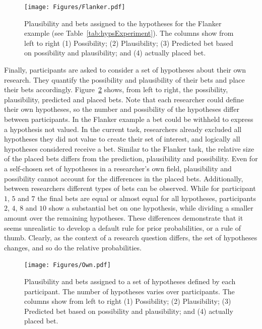 \documentclass[man]{apa6}
\begin{document}
\begin{figure}
	\texttt{[image: Figures/Flanker.pdf]}
	\caption{Plausibility and bets assigned to the hypotheses for the Flanker example (see Table~\ref{tab:hypsExperiment}). The columns show from left to right (1) Possibility; (2) Plausibility; (3) Predicted bet based on possibility and plausibility; and (4) actually placed bet.}
	\label{fig:flanker}
\end{figure}

Finally, participants are asked to consider a set of hypotheses about their own research.
They quantify the possibility and plausibility of their bets and place their bets accordingly.
Figure~\ref{fig:ownhyp} shows, from left to right, the possibility, plausibility, predicted and placed bets.
Note that each researcher could define their own hypotheses, so the number and possibility of the hypotheses differ between participants.
In the Flanker example a bet could be withheld to express a hypothesis not valued.
In the current task, researchers already excluded all hypotheses they did not value to create their set of interest, and logically all hypotheses considered receive a bet.
Similar to the Flanker task, the relative size of the placed bets differs from the prediction, plausibility and possibility.
Even for a self-chosen set of hypotheses in a researcher's own field, plausibility and possibility cannot account for the differences in the placed bets.
Additionally, between researchers different types of bets can be observed. 
While for participant $1$, $5$ and $7$ the final bets are equal or almost equal for all hypotheses, participants $2$, $4$, $8$ and $10$ show a substantial bet on one hypothesis, while dividing a smaller amount over the remaining hypotheses.
These differences demonstrate that it seems unrealistic to develop a default rule for prior probabilities, or a rule of thumb. 
Clearly, as the context of a research question differs, the set of hypotheses changes, and so do the relative probabilities.

\begin{figure}
	\texttt{[image: Figures/Own.pdf]}
	\caption{Plausibility and bets assigned to a set of hypotheses defined by each participant. The number of hypotheses varies over participants. The columns show from left to right (1) Possibility; (2) Plausibility; (3) Predicted bet based on possibility and plausibility; and (4) actually placed bet.}
	\label{fig:ownhyp}
\end{figure}
\end{document}
